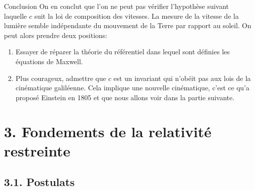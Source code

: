 \documentclass[french, a4paper, 10pt, twocolumn, landscape]{article}
\begin{document}
\begin{definition}{Conclusion}
	On en conclut que l'on ne peut pas vérifier l'hypothèse suivant laquelle $c$ suit la loi de composition des vitesses. La mesure de la vitesse de la lumière semble indépendante du mouvement de la Terre par rapport au soleil. On peut alors prendre deux positions: 
	\begin{enumerate}
		\item Essayer de réparer la théorie du référentiel dans lequel sont définies les équations de Maxwell. 
		\item Plus courageux, admettre que $c$ est un invariant qui n'obéit pas aux lois de la cinématique galiléenne. Cela implique une nouvelle cinématique, c'est ce qu'a proposé Einstein en 1805 et que nous allons voir dans la partie suivante.
	\end{enumerate}
\end{definition}

\section*{3. Fondements de la relativité restreinte}

\subsection*{3.1. Postulats}
\end{document}
